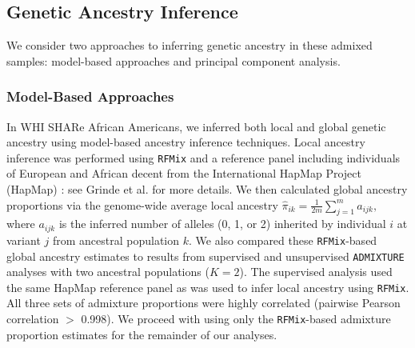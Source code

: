 \documentclass[12pt]{article}
\begin{document}
\subsection{Genetic Ancestry Inference}

We consider two approaches to inferring genetic ancestry in these admixed samples: model-based approaches and principal component analysis.

\subsubsection{Model-Based Approaches}

In WHI SHARe African Americans, we inferred both local and global genetic ancestry using model-based ancestry inference techniques. 
Local ancestry inference was performed using \texttt{RFMix} \citep{rfmix} and a reference panel including individuals of European and African decent from the International HapMap Project (HapMap) \citep{hapmap}: see Grinde et al. \cite{steam} for more details.
We then calculated global ancestry proportions via the genome-wide average local ancestry $\hat\pi_{ik} = \frac{1}{2m}\sum_{j=1}^m a_{ijk},$ where $a_{ijk}$ is the inferred number of alleles (0, 1, or 2) inherited by individual $i$ at variant $j$ from ancestral population $k$.
We also compared these \texttt{RFMix}-based global ancestry estimates to results from supervised and unsupervised \texttt{ADMIXTURE}  \citep{admixture} analyses with two ancestral populations ($K = 2$).
The supervised analysis used the same HapMap reference panel as was used to infer local ancestry using \texttt{RFMix}.
All three sets of admixture proportions were highly correlated (pairwise Pearson correlation $>$ 0.998). 
We proceed with using only the \texttt{RFMix}-based admixture proportion estimates for the remainder of our analyses.
\end{document}
